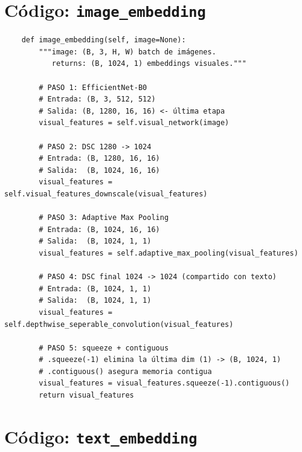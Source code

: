 \section{Código: \texttt{image\_embedding}}

\begin{verbatim}
    def image_embedding(self, image=None):
        """image: (B, 3, H, W) batch de imágenes.
           returns: (B, 1024, 1) embeddings visuales."""

        # PASO 1: EfficientNet-B0
        # Entrada: (B, 3, 512, 512)
        # Salida: (B, 1280, 16, 16) <- última etapa
        visual_features = self.visual_network(image)

        # PASO 2: DSC 1280 -> 1024
        # Entrada: (B, 1280, 16, 16)
        # Salida:  (B, 1024, 16, 16)
        visual_features = self.visual_features_downscale(visual_features)

        # PASO 3: Adaptive Max Pooling
        # Entrada: (B, 1024, 16, 16)
        # Salida:  (B, 1024, 1, 1)
        visual_features = self.adaptive_max_pooling(visual_features)

        # PASO 4: DSC final 1024 -> 1024 (compartido con texto)
        # Entrada: (B, 1024, 1, 1)
        # Salida:  (B, 1024, 1, 1)
        visual_features = self.depthwise_seperable_convolution(visual_features)

        # PASO 5: squeeze + contiguous
        # .squeeze(-1) elimina la última dim (1) -> (B, 1024, 1)
        # .contiguous() asegura memoria contigua
        visual_features = visual_features.squeeze(-1).contiguous()
        return visual_features
\end{verbatim}

\section{Código: \texttt{text\_embedding}}

